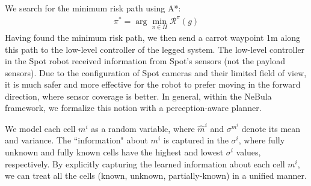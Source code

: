 \documentclass[letterpaper, 10 pt, conference]{ieeeconf}  %
\newcommand{\pr}[1]{\textbf{#1:}}  %
\newcommand{\ph}[1]{\pr{#1}} %
\begin{document}

We search for the minimum risk path using A*:
\begin{align}
    \pi^* = \arg\min_{\pi\in\Pi}\mathcal{R}^{\pi}(g)
    \label{deterministic_plan}
\end{align}
Having found the minimum risk path, we then send a carrot waypoint 1m along this path to the low-level controller of the legged system. The low-level controller in the Spot robot received information from Spot's sensors (not the payload sensors). Due to the configuration of Spot cameras and their limited field of view, it is much safer and more effective for the robot to prefer moving in the forward direction, where sensor coverage is better.  In general, within the NeBula framework, we formalize this notion with a perception-aware planner.

We model each cell $m^i$ as a random variable, where $\hat{m}^i$ and $\sigma^{m^i}$ denote its mean and variance. The ``information" about $m^i$ is captured in the $\sigma^i$, where fully unknown and fully known cells have the highest and lowest $\sigma^i$ values, respectively.  By explicitly capturing the learned information about each cell $m^i$, we can treat all the cells (known, unknown, partially-known) in a unified manner. 
\end{document}
